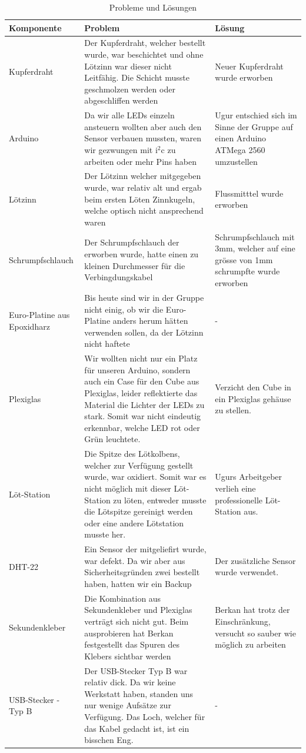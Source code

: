 \documentclass{article}
\newlength\mylength
\begin{document}
\begin{table}
    \caption{Probleme und Lösungen}
    \begin{tabular}{p{\mylength}|p{\mylength}|p{\mylength}}
        \hline
        \textbf{Komponente} & \textbf{Problem}  &\textbf{Lösung}  \\
        \hline \hline
        Kupferdraht & Der Kupferdraht, welcher bestellt wurde, war beschichtet und ohne Lötzinn war dieser nicht Leitfähig. Die Schicht musste geschmolzen werden oder abgeschliffen werden  & Neuer Kupferdraht wurde erworben\\
        Arduino     & Da wir alle LEDs einzeln ansteuern wollten aber auch den Sensor verbauen mussten, waren wir gezwungen mit i$^2$c zu arbeiten oder mehr Pins haben& Ugur entschied sich im Sinne der Gruppe auf einen Arduino ATMega 2560 umzustellen        \\
        Lötzinn        & Der Lötzinn welcher mitgegeben wurde, war relativ alt und ergab beim ersten Löten Zinnkugeln, welche optisch nicht ansprechend waren & Flussmitttel wurde erworben \\
        Schrumpfschlauch         & Der Schrumpfschlauch der erworben wurde, hatte einen zu kleinen Durchmesser für die Verbingdungskabel &  Schrumpfschlauch mit 3mm, welcher auf eine grösse von 1mm schrumpfte wurde erworben\\
        Euro-Platine aus Epoxidharz   & Bis heute sind wir in der Gruppe nicht einig, ob wir die Euro-Platine anders herum hätten verwenden sollen, da der Lötzinn nicht haftete & -      \\
        Plexiglas   & Wir wollten nicht nur ein Platz für unseren Arduino, sondern auch ein Case für den Cube aus Plexiglas, leider reflektierte das Material die Lichter der LEDs zu stark. Somit war nicht eindeutig erkennbar, welche LED rot oder Grün leuchtete. & Verzicht den Cube in ein Plexiglas gehäuse zu stellen.      \\
        Löt-Station & Die Spitze des Lötkolbens, welcher zur Verfügung gestellt wurde, war oxidiert. Somit war es nicht möglich mit dieser Löt-Station zu löten, entweder musste die Lötspitze gereinigt werden oder eine andere Lötstation musste her. & Ugurs Arbeitgeber verlieh eine professionelle Löt-Station aus.\\
        DHT-22   & Ein Sensor der mitgeliefirt wurde, war defekt. Da wir aber aus Sicherheitsgründen zwei bestellt haben, hatten wir ein Backup & Der zusätzliche Sensor wurde verwendet.      \\
        Sekundenkleber & Die Kombination aus Sekundenkleber und Plexiglas verträgt sich nicht gut. Beim ausprobieren hat Berkan festgestellt das Spuren des Klebers sichtbar werden & Berkan hat trotz der Einschränkung, versucht so sauber wie möglich zu arbeiten\\
        USB-Stecker - Typ B & Der USB-Stecker Typ B war relativ dick. Da wir keine Werkstatt haben, standen uns nur wenige Aufsätze zur Verfügung. Das Loch, welcher für das Kabel gedacht ist, ist ein bisschen Eng. & -  \\
        

\end{tabular}
\end{table}
\end{document}
